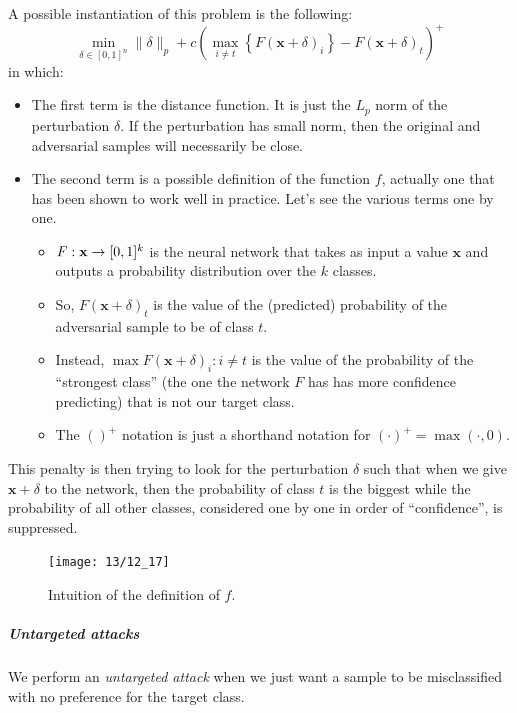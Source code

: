 A possible instantiation of this problem is the following:
\begin{equation}
	\min_{\delta \in [0,1]^n} \|\delta\|_p + c(\max_{i \neq t} \left\{ F(\mathbf{x}+\delta)_i \right\} - F(\mathbf{x}+ \delta)_t)^+
\end{equation}
in which:
\begin{itemize}
    \item The first term is the distance function. It is just the $L_p$ norm of the perturbation $\delta$. If the perturbation has small norm, then the original and adversarial samples will necessarily be close.
    
    \item The second term is a possible definition of the function $f$, actually one that has been shown to work well in practice. Let's see the various terms one by one.
    \begin{itemize}
        \item $F: \vb{x} \to [0, 1]^k$ is the neural network that takes as input a value $\mathbf{x}$ and outputs a probability distribution over the $k$ classes.
        \item So, $F(\mathbf{x}+ \delta)_t$ is the value of the (predicted) probability of the adversarial sample to be of class $t$.
        \item Instead, $\max{F(\mathbf{x}+\delta)_i : i \neq t}$ is the value of the probability of the ``strongest class'' (the one the network $F$ has has more confidence predicting) that is not our target class.
        \item The $()^+$ notation is just a shorthand notation for $(\cdot)^+ = \max(\cdot, 0)$.
    \end{itemize} 
\end{itemize}

This penalty is then trying to look for the perturbation $\delta$ such that when we give $\mathbf{x} + \delta$ to the network, then the probability of class $t$ is the biggest while the probability of all other classes, considered one by one in order of ``confidence'', is suppressed.
\begin{figure}[H]
	\centering
	\texttt{[image: 13/12\_17]}
	\caption{Intuition of the definition of $f$.}\label{fig:intuition}	
\end{figure}

\subparagraph{Untargeted attacks}

We perform an \emph{untargeted attack} when we just want a sample to be misclassified with no preference for the target class. 


